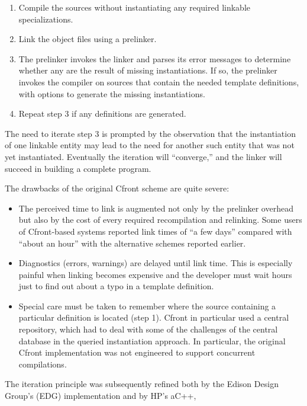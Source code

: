 \begin{enumerate}
\item 
Compile the sources without instantiating any required linkable specializations.

\item 
Link the object files using a prelinker.

\item 
The prelinker invokes the linker and parses its error messages to determine whether any are the result of missing instantiations. If so, the prelinker invokes the compiler on sources that contain the needed template definitions, with options to generate the missing instantiations.

\item 
Repeat step 3 if any definitions are generated.
\end{enumerate}

The need to iterate step 3 is prompted by the observation that the instantiation of one linkable entity may lead to the need for another such entity that was not yet instantiated. Eventually the iteration will “converge,” and the linker will succeed in building a complete program.

The drawbacks of the original Cfront scheme are quite severe:

\begin{itemize}
\item 
The perceived time to link is augmented not only by the prelinker overhead but also by the cost of every required recompilation and relinking. Some users of Cfront-based systems reported link times of “a few days” compared with “about an hour” with the alternative schemes reported earlier.

\item 
Diagnostics (errors, warnings) are delayed until link time. This is especially painful when linking becomes expensive and the developer must wait hours just to find out about a typo in a template definition.

\item 
Special care must be taken to remember where the source containing a particular definition is located (step 1). Cfront in particular used a central repository, which had to deal with some of the challenges of the central database in the queried instantiation approach. In particular, the original Cfront implementation was not engineered to support concurrent compilations.
\end{itemize}

The iteration principle was subsequently refined both by the Edison Design Group’s (EDG) implementation and by HP’s aC++,

